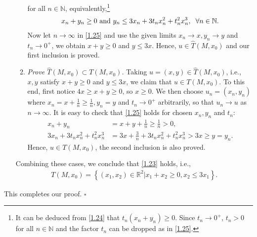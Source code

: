 \documentclass[a4paper]{article}
\numberwithin{equation}{section}
\begin{document}
\begin{enumerate}
\begin{enumerate}
for all $n \in \mathbb{N}$, equivalently,\footnote{It can be deduced from \eqref{1.24} that $ {t_n}\left( {{x_n} + {y_n}} \right) \ge 0$. Since $t_n\to 0^+$, $t_n>0$ for all $n\in \mathbb{N}$ and the factor $t_n$ can be dropped as in \eqref{1.25}.}
\begin{align}
\label{1.25}
{x_n} + {y_n} \ge 0\mbox{ and } {y_n} \le 3{x_n} + 3{t_n}x_n^2 + t_n^2x_n^3,\hspace{0.2cm} \forall n \in \mathbb{N}.
\end{align}
Now let $n\to \infty$ in \eqref{1.25} and use the given limits $x_n\to x,y_n\to y$ and $t_n\to 0^+$, we obtain $x+y\ge 0$ and $y\le 3x$. Hence, $u\in \widehat T\left(M,x_0\right)$ and our first inclusion is proved.
\item \textit{Prove $\widehat T\left( {M,{x_0}} \right) \subset T\left( {M,{x_0}} \right)$.} Taking $u=\left(x,y\right)\in \widehat T\left(M,x_0\right)$, i.e., $x,y$ satisfy $x+y\ge 0$ and $y\le 3x$, we claim that $u\in T\left(M,x_0\right)$. To this end, first notice $4x\ge x+y\ge 0$, so $x\ge 0$. We then choose $u_n=\left(x_n,y_n\right)$ where $x_n=x+\frac{1}{n}\ge \frac{1}{n},y_n=y$ and $t_n\to 0^+$ arbitrarily, so that $u_n\to u$ as $n\to \infty$. It is easy to check that \eqref{1.25} holds for chosen $x_n,y_n$ and $t_n$:
\begin{align}
{x_n} + {y_n} &= x + y + \frac{1}{n} \ge \frac{1}{n} > 0,\\
3{x_n} + 3{t_n}x_n^2 + t_n^2x_n^3 &= 3x + \frac{3}{n} + 3{t_n}x_n^2 + t_n^2x_n^3 > 3x \ge y = {y_n}.
\end{align} 
Hence, $u\in T\left(M,x_0\right)$, the second inclusion is also proved.
\end{enumerate}
Combining these cases, we conclude that \eqref{1.23} holds, i.e.,
\begin{align}
\label{1.28}
T\left( {M,{x_0}} \right) = \left\{ {\left( {{x_1},{x_2}} \right) \in {\mathbb{R}^2}|{x_1} + {x_2} \ge 0,{x_2} \le 3{x_1}} \right\}.
\end{align}
\end{enumerate}
This completes our proof. \hfill $\square$\\
\end{document}
